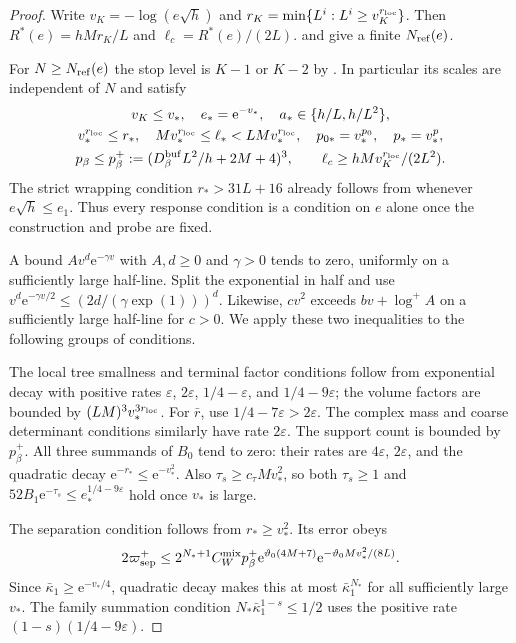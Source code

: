\documentclass[11pt,letterpaper,reqno]{amsart}
\begin{document}
\begin{proof}
Write
$v_K=-\log(e\sqrt h)$ and
$r_K=\min\{L^i:L^i\ge v_K^{r_{\rm loc}}\}$.
Then $R^*(e)=hMr_K/L$ and
$\ell_c=R^*(e)/(2L)$.
\cite[Proposition~6.1]{CoverTuning} and
\cite[(53)]{CoverTuning} give
a finite $N_{\rm ref}(e)$.

For $N\ge N_{\rm ref}(e)$ the stop level
is $K-1$ or $K-2$ by
\cite[(54)]{CoverTuning}. In particular its
scales are independent of $N$ and satisfy
\begin{gather}
 v_K\le v_*,\quad e_*=\mathrm e^{-v_*},\quad
 a_*\in\{h/L,h/L^2\},\notag\\
 v_*^{r_{\rm loc}}\le r_*,\quad
 Mv_*^{r_{\rm loc}}\le\ell_*<LMv_*^{r_{\rm loc}},
 \quad p_{0*}=v_*^{p_0},\quad p_*=v_*^p,\notag\\
 p_\beta\le p_\beta^+:=
                (D_\beta^{\rm buf}L^2/h+2M+4)^3,\qquad
 \ell_c\ge hMv_K^{r_{\rm loc}}/(2L^2).
                                  \label{eq:interacting-threshold-scales}
\end{gather}
The strict wrapping condition $r_*>31L+16$
already follows from \cite[(50)]{CoverTuning}
whenever $e\sqrt h\le e_1$.
Thus every response condition is a condition
on $e$ alone once the construction and probe
are fixed.

A bound $A v^d \mathrm e^{-\gamma v}$
with $A,d\ge0$ and $\gamma>0$ tends to zero,
uniformly on a sufficiently large half-line.
Split the exponential in half and use
$v^d\mathrm e^{-\gamma v/2}\le(2d/(\gamma\exp(1)))^d$.
Likewise, $cv^2$ exceeds $bv+\log^+A$
on a sufficiently large half-line for
$c>0$. We apply these two inequalities to
the following groups of conditions.

The local tree smallness and terminal factor
conditions follow from exponential decay
with positive rates
$\varepsilon$, $2\varepsilon$,
$1/4-\varepsilon$, and $1/4-9\varepsilon$;
the volume factors are bounded by
$(LM)^3v_*^{3r_{\rm loc}}$.
For $\bar r$, use
$1/4-7\varepsilon>2\varepsilon$.
The complex mass and coarse determinant
conditions similarly have rate $2\varepsilon$.
The support count is bounded by $p_\beta^+$.
All three summands of $B_0$ tend to zero:
their rates are $4\varepsilon$, $2\varepsilon$,
and the quadratic decay $\mathrm e^{-r_*}\le \mathrm e^{-v_*^2}$.
Also $\tau_s\ge c_\tau Mv_*^2$, so both
$\tau_s\ge1$ and
$52B_1\mathrm e^{-\tau_s}\le e_*^{1/4-9\varepsilon}$
hold once $v_*$ is large.

The separation condition follows from
$r_*\ge v_*^2$. Its error obeys
\[
 2\varpi_{\rm sep}^+
 \le2^{N_*+1}C_W^{\mathrm{mix}}p_\beta^+
          \mathrm e^{\vartheta_0(4M+7)}
          \mathrm e^{-\vartheta_0Mv_*^2/(8L)} .
\]
Since $\bar\kappa_1\ge \mathrm e^{-v_*/4}$,
quadratic decay makes this at most
$\bar\kappa_1^{N_*}$ for all sufficiently
large $v_*$. The family summation condition
$N_*\bar\kappa_1^{1-s}\le1/2$
uses the positive rate
$(1-s)(1/4-9\varepsilon)$.


\end{proof}
\end{document}
